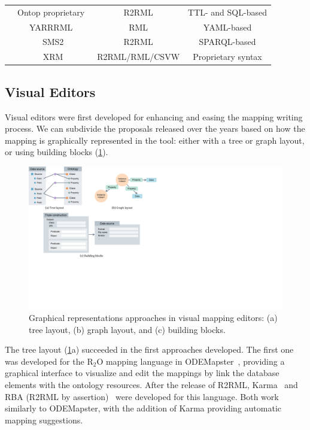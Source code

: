 \begin{table}[t]
{\begin{tabular}{cccc}
 & Ontop proprietary~\parencite{calvanese2017ontop} & R2RML & TTL- and SQL-based \\
 & YARRRML~\parencite{Heyvaert2018yarrrml} & RML & YAML-based \\
 & SMS2\tablefootnote{\label{foot:sms2}\url{https://docs.stardog.com/archive/7.5.0/virtual-graphs/mapping-data-sources.html\#sms2-stardog-mapping-syntax-2}} & R2RML & SPARQL-based \\
 & XRM\tablefootnote{\label{foot:xrm}\url{https://zazuko.com/products/expressive-rdf-mapper/}} & R2RML/RML/CSVW & Proprietary syntax \\ \bottomrule
\end{tabular}
}
\end{table}

\subsection{Visual Editors}
\label{sec:chp2_visual-editors}

Visual editors were first developed for enhancing and easing the mapping writing process. We can subdivide the proposals released over the years based on how the mapping is graphically represented in the tool: either with a tree or graph layout, or using building blocks (\cref{fig:chp2_visual-editors}).


\begin{figure}[t]
\centering
\includegraphics[width=\linewidth]{figures/chp2_visual-editors.pdf}
\caption[Graphical representations approaches in visual mapping editors.]{Graphical representations approaches in visual mapping editors: (a) tree layout, (b) graph layout, and (c) building blocks.}
\label{fig:chp2_visual-editors}
\end{figure}

The tree layout (\cref{fig:chp2_visual-editors}a) succeeded in the first approaches developed. 
The first one was developed for the R$_2$O mapping language in ODEMapster~\parencite{barrasa2006odemapster}, providing a graphical interface to visualize and edit the mappings by link the database elements with the ontology resources. 
After the release of R2RML, Karma~\parencite{gupta2012karma} and RBA (R2RML by assertion)~\parencite{neto2013rba} were developed for this language. Both work similarly to ODEMapster, with the addition of Karma providing automatic mapping suggestions. 

